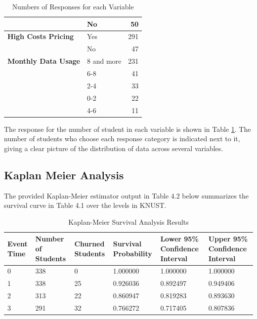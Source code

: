\documentclass[doublespacing,12pt]{report}
\begin{document}
\begin{table}[H]
\begin{tabular}{llr}
                                                 & No & 50 \\
        \midrule
        \textbf{High Costs Pricing} & Yes & 291 \\
                                     & No & 47 \\
        \midrule
        \textbf{Monthly Data Usage} & 8 and more & 231 \\
                                    & 6-8 & 41 \\
                                    & 2-4 & 33 \\
                                    & 0-2 & 22 \\
                                    & 4-6 & 11 \\
        \bottomrule

    \end{tabular}
    \caption{Numbers of Responses for each Variable}
    \label{tab: description}
\end{table}
\noindent The response for the number of student in each variable is shown in Table \ref{tab: description}. The number of students who choose each response category is indicated next to it, giving a clear picture of the distribution of data across several variables.




\subsection{Kaplan Meier Analysis}

The provided Kaplan-Meier estimator output in Table 4.2 below summarizes the survival curve in Table 4.1 over the levels in KNUST.


\begin{table}[H]
\centering
\begin{tabularx}{\textwidth}{lXXXXX}
\toprule
Event Time & Number of Students & Churned Students & Survival Probability & Lower 95\% Confidence Interval & Upper 95\% Confidence Interval \\
\midrule
0 & 338 & 0 & 1.000000 & 1.000000 & 1.000000 \\
1 & 338 & 25 & 0.926036 & 0.892497 & 0.949406 \\
2 & 313 & 22 & 0.860947 & 0.819283 & 0.893630 \\
3 & 291 & 32 & 0.766272 & 0.717405 & 0.807836 \\ 
\bottomrule
\end{tabularx}
\caption{Kaplan-Meier Survival Analysis Results}
\label{tab:km_results}
\end{table}
\end{document}
